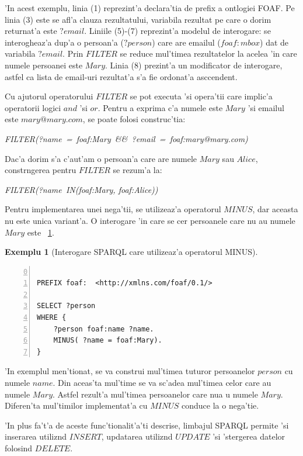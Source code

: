 \documentclass[12pt,a4paper,twoside]{report}
\newtheorem{example}{Exemplu}
\begin{document}
'In acest exemplu, linia (1) reprezint'a declara'tia de prefix a ontlogiei FOAF. Pe linia (3) este se afl'a clauza rezultatului, variabila rezultat pe care o dorim returnat'a este $?email$. Liniile (5)-(7) reprezint'a modelul de interogare: se interogheaz'a dup'a o persoan'a ($?person$) care are emailul ($foaf:mbox$) dat de variabila $?email$. Prin $FILTER$ se reduce mul'timea rezultatelor la acelea 'in care numele persoanei este $Mary$. Linia (8) prezint'a un modificator de interogare, astfel ca lista de email-uri rezultat'a s'a fie ordonat'a asccendent.

Cu ajutorul operatorului $FILTER$ se pot executa 'si opera'tii care implic'a operatorii logici $and$ 'si $or$. Pentru a exprima c'a numele este $Mary$ 'si emailul este $mary@mary.com$, se poate folosi construc'tia: 
\begin{center}
{\it FILTER(?name\ =\ foaf:Mary\ \&\&\ ?email\ =\ foaf:mary@mary.com)}
\end{center}

Dac'a dorim s'a c'aut'am o persoan'a care are numele $Mary$ sau $Alice$, constr\ia ngerea pentru $FILTER$ se rezum'a la:
\begin{center}
{\it FILTER(?name\ IN(foaf:Mary, foaf:Alice))}
\end{center} 

Pentru implementarea unei nega'tii, se utilizeaz'a operatorul $MINUS$, dar aceasta nu este unica variant'a. O interogare 'in care se cer persoanele care nu au numele $Mary$ este ~\ref{ex:ex_minus}.

\begin{example}[Interogare SPARQL care utilizeaz'a operatorul MINUS]
\begin{lstlisting}[basicstyle=\footnotesize, numbers=left, firstnumber = 0]

PREFIX foaf:  <http://xmlns.com/foaf/0.1/>

SELECT ?person
WHERE {
    ?person foaf:name ?name.
    MINUS( ?name = foaf:Mary).
} 
\end{lstlisting}
\label{ex:ex_minus}
\end{example}

'In exemplul men'tionat, se va construi mul'timea tuturor persoanelor $person$ cu numele $name$. Din aceas'ta mul'time se va sc'adea mul'timea celor care au numele $Mary$. Astfel rezult'a mul'timea persoanelor care nua u numele $Mary$. Diferen'ta mul'timilor implementat'a cu $MINUS$ conduce la o nega'tie.

'In plus fa't'a de aceste func'tionalit'a'ti descrise, limbajul SPARQL permite 'si inserarea utiliz\ia nd $INSERT$, updatarea utiliz\ia nd $UPDATE$ 'si 'stergerea datelor folosind $DELETE$.
\end{document}
